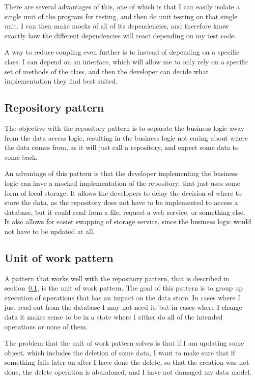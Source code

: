 There are several advantages of this, one of which is that I can easily isolate
a single unit of the program for testing, and then do unit testing on that
single unit. I can then make mocks of all of its dependencies, and therefore
know exactly how the different dependencies will react depending on my test
code\cite{dependency_injection}. 

A way to reduce coupling even further is to instead of depending on a specific
class. I can depend on an interface, which will allow me to only rely on a
specific set of methods of the class, and then the developer can decide what
implementation they find best suited. 

\subsection{Repository pattern}
\label{sub:Repository pattern}
The objective with the repository pattern is to separate the business logic away
from the data access logic, resulting in the business logic not caring about
where the data comes from, as it will just call a repository, and expect some
data to come back. 

An advantage of this pattern is that the developer implementing the business
logic can have a mocked implementation of the repository, that just uses some
form of local storage. It allows the developers to delay the decision of where
to store the data, as the repository does not have to be implemented to access a
database, but it could read from a file, request a web service, or something
else\cite{repository_pattern}. It also allows for easier swapping of storage
service, since the business logic would not have to be updated at all. 

\subsection{Unit of work pattern}
\label{sub:Unit of work pattern}
A pattern that works well with the repository pattern, that is described in
section~\ref{sub:Repository pattern}, is the unit of work pattern. The goal of
this pattern is to group up execution of operations that has an impact on the
data store. In cases where I just read out from the database I may not need it,
but in cases where I change data it makes sense to be in a state where I either
do all of the intended operations or none of them. 

The problem that the unit of work pattern solves is that if I am updating some
object, which includes the deletion of some data, I want to make sure that if
something fails later on after I have done the delete, so that the creation was
not done, the delete operation is abandoned, and I have not damaged my data
model\cite{uow}. 

